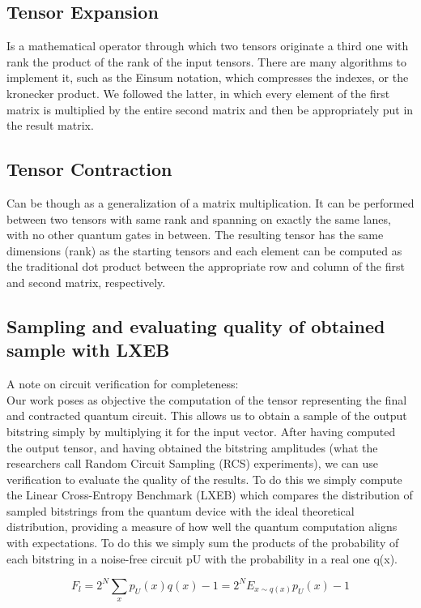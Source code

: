\documentclass[12pt,oneside,a4paper]{article}
\begin{document}
\subsection{Tensor Expansion}
Is a mathematical operator through which two tensors originate a third one with rank the product of the rank of the input tensors. There are many algorithms to implement it, such as the Einsum notation, which compresses the indexes, or the kronecker product. We followed the latter, in which every element of the first matrix is multiplied by the entire second matrix and then be appropriately put in the result matrix.

\subsection{Tensor Contraction}
Can be though as a generalization of a matrix multiplication. It can be performed between two tensors with same rank and spanning on exactly the same lanes, with no other quantum gates in between. The resulting tensor has the same dimensions (rank) as the starting tensors and each element can be computed as the traditional dot product between the appropriate row and column of the first and second matrix, respectively.


\subsection{Sampling and evaluating quality of obtained sample with LXEB}
A note on circuit verification for completeness:\\
Our work poses as objective the computation of the tensor representing the final and contracted quantum circuit. This allows us to obtain a sample of the output bitstring simply by multiplying it for the input vector. After having computed the output tensor, and having obtained the bitstring amplitudes (what the researchers call Random Circuit Sampling (RCS) experiments), we can use verification to evaluate the quality of the results. To do this we simply compute the Linear Cross-Entropy Benchmark (LXEB) which compares the distribution of sampled bitstrings from the quantum device with the ideal theoretical distribution, providing a measure of how well the quantum computation aligns with expectations. To do this we simply sum the products of the probability of each bitstring in a noise-free circuit pU with the probability in a real one q(x).

\begin{equation}
    F_l = 2^N \sum_x p_U(x)q(x) - 1 = 2^N E_{x \sim q(x)} p_U(x) - 1
\end{equation}
\end{document}
